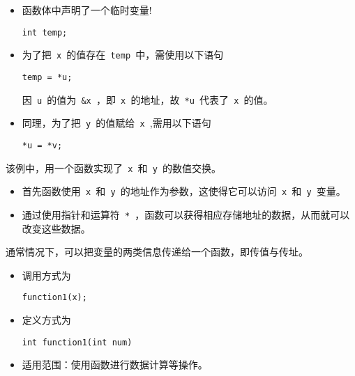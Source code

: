 \begin{frame}[fragile]
\begin{itemize}
\item
函数体中声明了一个临时变量!
\begin{lstlisting}[backgroundcolor=\color{blue!10}]
int temp;
\end{lstlisting}
\item
为了把\lstinline| x |的值存在\lstinline| temp |中，需使用以下语句
\begin{lstlisting}[backgroundcolor=\color{blue!10}]
temp = *u; 
\end{lstlisting}
因\lstinline| u |的值为\lstinline| &x |，即\lstinline| x |的地址，故\lstinline| *u |代表了\lstinline| x |的值。\\[0.1in]
\item 
同理，为了把\lstinline| y |的值赋给\lstinline| x |,需用以下语句
\begin{lstlisting}[backgroundcolor=\color{blue!10}]
*u = *v;
\end{lstlisting}
\end{itemize}
\end{frame}

\begin{frame}[fragile]
该例中，用一个函数实现了\lstinline| x |和\lstinline| y |的数值交换。\vspace{0.1in}

\begin{itemize}
\item
首先函数使用\lstinline| x |和\lstinline| y |的地址作为参数，这使得它可以访问\lstinline| x |和\lstinline| y |变量。\\[0.1in]
\item 
通过使用指针和运算符\lstinline| * |，函数可以获得相应存储地址的数据，从而就可以改变这些数据。
\end{itemize}
\end{frame}

\begin{frame}[fragile]
通常情况下，可以把变量的两类信息传递给一个函数，即传值与传址。
\end{frame}

\begin{frame}[fragile]
\begin{itemize}
\item 调用方式为
\begin{lstlisting}[backgroundcolor=\color{blue!10}]
function1(x);
\end{lstlisting}
\item 定义方式为
\begin{lstlisting}[backgroundcolor=\color{blue!10}]
int function1(int num)
\end{lstlisting}
\item 适用范围：使用函数进行数据计算等操作。
\end{itemize}

\end{frame}

